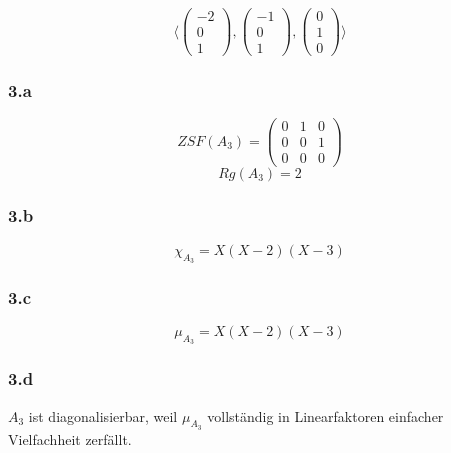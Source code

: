 \documentclass[10pt,a4paper]{article}
\begin{document}
\begin{equation}
\langle
\begin{pmatrix}
-2\\0\\1
\end{pmatrix},
\begin{pmatrix}
-1\\0\\1
\end{pmatrix},
\begin{pmatrix}
0\\1\\0
\end{pmatrix}
\rangle
\end{equation}

\subsubsection*{3.a}

\begin{equation}
ZSF(A_{3}) = 
\begin{pmatrix}
0 & 1 & 0\\
0 & 0 & 1\\
0 & 0 & 0
\end{pmatrix}
\end{equation}
\begin{equation}
Rg(A_{3}) = 2
\end{equation}

\subsubsection*{3.b}

\begin{equation}
\chi_{A_{3}} = X(X-2)(X-3)
\end{equation}

\subsubsection*{3.c}

\begin{equation}
\mu_{A_{3}} = X(X-2)(X-3)
\end{equation}

\subsubsection*{3.d}

$A_{3}$ ist diagonalisierbar, weil $\mu_{A_{3}}$ vollständig in Linearfaktoren einfacher Vielfachheit zerfällt.
\end{document}
